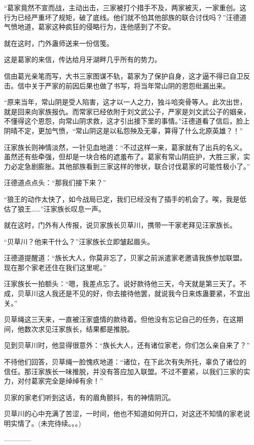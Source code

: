 \begin{this_body}
“葛家竟然不宣而战，主动出击，三家被打个措手不及，两家被灭，一家重创。这行为已经严重坏了规矩，破了底线。他们就不怕其他部族的联合讨伐吗？”汪德道气愤地道，葛家这种疯狂的侵略行为，连他感到了不安。

就在这时，门外蛊师送来一份信笺。

这是葛家的来信，传达给月牙湖畔几乎所有的势力。

信由葛光亲笔而写，大书三家图谋不轨，葛家为了保护自身，这才逼不得已自卫反击。信中关于严家的前因后果也做了书写，将当年常山阴的恩怨纰漏出来。

“原来当年，常山阴是受人陷害，这才以一人之力，独斗哈突骨等人。此次出世，就是回来向家族报仇。而常家已经依附于刘文武公子，严家是刘文武公子的姻亲，不懂得这个恩怨，向常山阴求救，这才引出接下里的事情。”汪德道看了信后，脸上阴晴不定，更加气愤，“常山阴这是以私怨殃及无辜，算得了什么北原英雄？！”

汪家族长则神情淡然，一针见血地道：“不过这样一来，葛家就有了出兵的名义。虽然还有些牵强，但却是一块合格的遮羞布了。葛家有常山阴庇护，大胜三家，实力必定急剧膨胀。其他部族看到三家这样的惨状，联合讨伐葛家的可能性极小了。”

汪德道点点头：“那我们接下来？”

“狼王的动作太快了，如今战局已定，我们已经没有了插手的机会了。唉，我是低估了狼王……”汪家族长叹息一声。

就在这时，门外有人传报，说贝家族长贝草川，携带一干家老拜见汪家族长。

“贝草川？他来干什么？”汪家族长立即皱起眉头。

汪德道提醒道：“族长大人，你莫非忘了，贝家之前派遣家老邀请我族参加联盟。现在那个家老还住在我们这里呢。”

汪家族长一拍额头：“嗯，我差点忘了。说好款待他三天，今天就是第三天了。不成，贝草川这人我还是不见的好，你去接待他罢，就说我今日来炼蛊要紧，不宜出关。”

贝草绳这三天来，一直被汪家盛情的款待着。但他没有忘记自己的任务，在这期间，他数次求见汪家族长，结果都是推脱。

见到贝草川时，他显得很意外：“族长大人，还有诸位家老，你们怎么亲自来了？”

不待他们回答，贝草绳一脸愧疚地道：“诸位，在下此次有失所托，辜负了诸位的信任。那汪家族长一味推脱，并没有答应加入联盟。不过不要紧，以我们三家的实力，对付葛家完全是绰绰有余！”

贝家的家老们听到这话，有的眉角颤抖，有的神情阴沉。

贝草川的心中充满了苦涩，一时间，他也不知道如何开口，对这还不知情的家老说明实情了。(未完待续。。。)

------------

\end{this_body}

